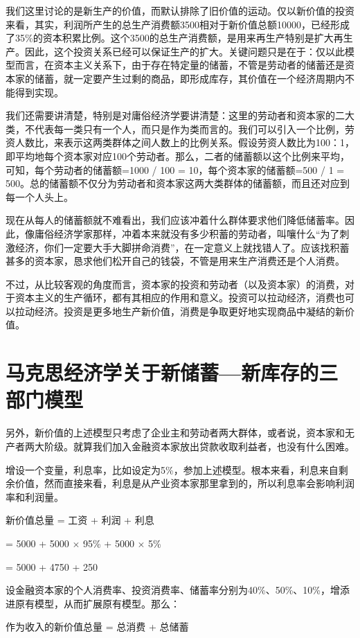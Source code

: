 \documentclass[a4paper]{ctexart}
\begin{document}
我们这里讨论的是新生产的价值，而默认排除了旧价值的运动。仅以新价值的投资来看，其实，利润所产生的总生产消费额3500相对于新价值总额10000，已经形成了35\%的资本积累比例。这个3500的总生产消费额，是用来再生产特别是扩大再生产。因此，这个投资关系已经可以保证生产的扩大。关键问题只是在于：仅以此模型而言，在资本主义关系下，由于存在特定量的储蓄，不管是劳动者的储蓄还是资本家的储蓄，就一定要产生过剩的商品，即形成库存，其价值在一个经济周期内不能得到实现。

我们还需要讲清楚，特别是对庸俗经济学要讲清楚：这里的劳动者和资本家的二大类，不代表每一类只有一个人，而只是作为类而言的。我们可以引入一个比例，劳资人数比，来表示这两类群体之间人数上的比例关系。假设劳资人数比为100：1，即平均地每个资本家对应100个劳动者。那么，二者的储蓄额以这个比例来平均，可知，每个劳动者的储蓄额=1000 / 100 = 10，每个资本家的储蓄额=500 / 1 = 500。总的储蓄额不仅分为劳动者和资本家这两大类群体的储蓄额，而且还对应到每一个人头上。

现在从每人的储蓄额就不难看出，我们应该冲着什么群体要求他们降低储蓄率。因此，像庸俗经济学家那样，冲着本来就没有多少积蓄的劳动者，叫嚷什么“为了刺激经济，你们一定要大手大脚拼命消费”，在一定意义上就找错人了。应该找积蓄甚多的资本家，恳求他们松开自己的钱袋，不管是用来生产消费还是个人消费。

不过，从比较客观的角度而言，资本家的投资和劳动者（以及资本家）的消费，对于资本主义的生产循环，都有其相应的作用和意义。投资可以拉动经济，消费也可以拉动经济。投资是更多地生产新价值，消费是争取更好地实现商品中凝结的新价值。

\section{马克思经济学关于新储蓄—新库存的三部门模型}

另外，新价值的上述模型只考虑了企业主和劳动者两大群体，或者说，资本家和无产者两大阶级。就算我们加入金融资本家放出贷款收取利益者，也没有什么困难。

增设一个变量，利息率，比如设定为5\%，参加上述模型。根本来看，利息来自剩余价值，然而直接来看，利息是从产业资本家那里拿到的，所以利息率会影响利润率和利润量。

新价值总量 = 工资 + 利润 + 利息

= 5000 + 5000 $\times$ 95\% + 5000 $\times$ 5\%

= 5000 + 4750 + 250

设金融资本家的个人消费率、投资消费率、储蓄率分别为40\%、50\%、10\%，增添进原有模型，从而扩展原有模型。那么：

作为收入的新价值总量 = 总消费 + 总储蓄
\end{document}
